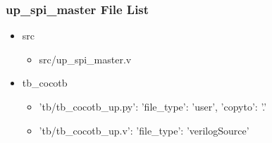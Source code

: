 \subsubsection{up\_spi\_master File List}
\begin{itemize}
\item src
	\begin{itemize}
	\item src/up\_spi\_master.v
	\end{itemize}
\item tb\_cocotb
	\begin{itemize}
	\item {'tb/tb\_cocotb\_up.py': {'file\_type': 'user', 'copyto': '.'}}
	\item {'tb/tb\_cocotb\_up.v': {'file\_type': 'verilogSource'}}
	\end{itemize}
\end{itemize}
